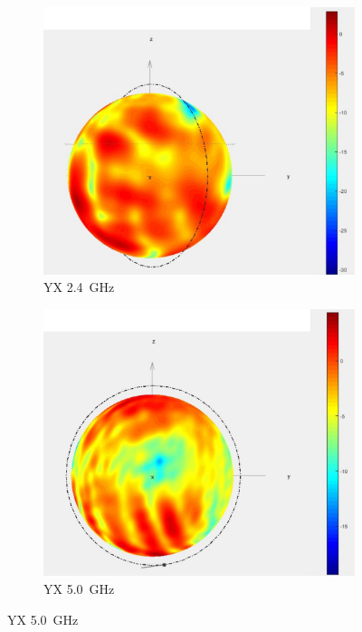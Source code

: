 \begin{figure}[h!]
\begin{center}
		\begin{subfigure}[t]{0.40\textwidth}
			\begin{center}
				\includegraphics[width=1\textwidth]{../fig/plt/star_lab_2ghz4_yz_reduced.png}
				\caption{YX \SI{2.4}{\giga\hertz}}
			\end{center}
		\end{subfigure}
		\begin{subfigure}[t]{0.40\textwidth}
			\begin{center}
				\includegraphics[width=1\textwidth]{../fig/plt/star_lab_5ghz0_yz_reduced.png}
				\caption{YX \SI{5.0}{\giga\hertz}}
			\end{center}
		\end{subfigure}
	\end{center}
\end{figure}


